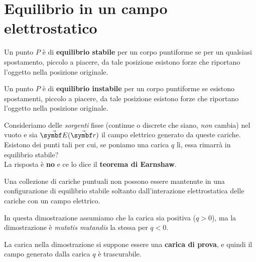 \section{Equilibrio in un campo elettrostatico}
\begin{define}
	Un punto $P$ è di \textbf{equilibrio stabile} per un corpo puntiforme se per un qualsiasi spostamento, piccolo a piacere, da tale posizione esistono forze che riportano l'oggetto nella posizione originale.
\end{define}
\begin{define}
	Un punto $P$ è di \textbf{equilibrio instabile} per un corpo puntiforme se esistono spostamenti, piccolo a piacere, da tale posizione esistono forze che riportano l'oggetto nella posizione originale.
\end{define}
Consideriamo delle \textit{sorgenti} fisse (continue o discrete che siano, \textit{non} cambia) nel vuoto e sia $\vba{E}(\vba{r})$ il campo elettrico generato da queste cariche. Esistono dei punti tali per cui, se poniamo una carica $q$ lì, essa rimarrà in equilibrio stabile?\\
La risposta è \textbf{no} e ce lo dice il \textbf{teorema di Earnshaw}.
\begin{theorema}
	Una collezione di cariche puntuali non possono essere mantenute in una configurazione di equilibrio stabile soltanto dall'interazione elettrostatica delle cariche con un campo elettrico.
\end{theorema}
In questa dimostrazione assumiamo che la carica sia positiva ($q>0$), ma la dimostrazione è \textit{mutatis mutandis} la stessa per $q<0$.
\begin{observe}
	La carica nella dimostrazione si suppone essere una \textbf{carica di prova}, e quindi il campo generato dalla carica $q$ è trascurabile.
\end{observe}
